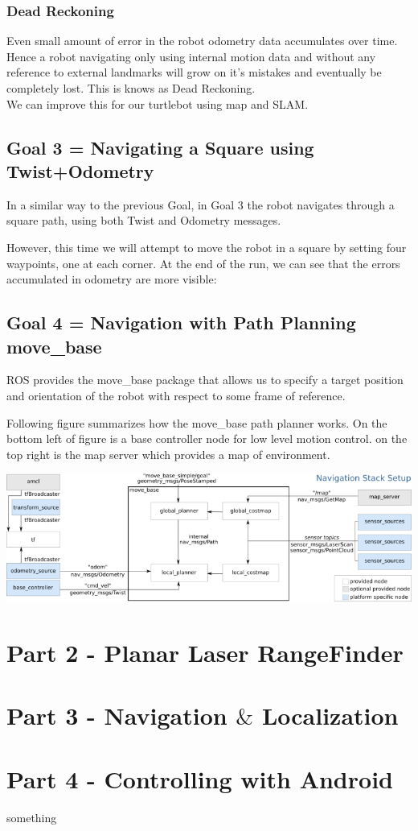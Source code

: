 \documentclass[10pt,a4paper]{article}
\begin{document}
\subsubsection{Dead Reckoning}
Even small amount of error in the robot odometry data accumulates over time. Hence a robot navigating only using internal motion data and without any reference to external landmarks will grow on it's mistakes and eventually be completely lost. This is knows as Dead Reckoning. \\
We can improve this for our turtlebot using map and SLAM.

\subsection{Goal 3 = Navigating a Square using Twist+Odometry}
In a similar way to the previous Goal, in Goal 3 the robot navigates through a square path, using both Twist and Odometry messages.

However, this time we will attempt to move the robot in a square by setting four waypoints, one at each corner. At the end of the run, we can see that the errors accumulated in odometry are more visible:


\subsection{Goal 4 = Navigation with Path Planning move\_base}
ROS provides the move\_base package that allows us to specify a target position and orientation of the robot with respect to some frame of reference.

Following figure summarizes how the move\_base path planner works. On the bottom left of figure is a base controller node for low level motion control. on the top right is the map server which provides a map of environment.

\begin{center}
\includegraphics[width=\textwidth]{overview_small.png}
\end{center}
\section{Part 2 - Planar Laser RangeFinder}


\section{Part 3 - Navigation $\&$ Localization}

\section{Part 4 - Controlling with Android}


something
\end{document}
